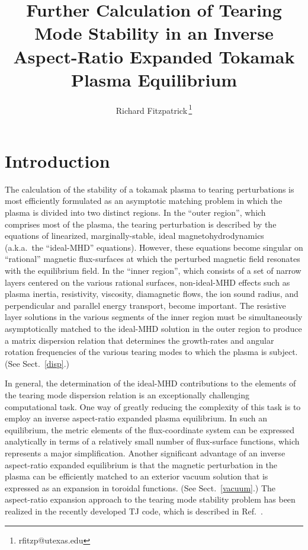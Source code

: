 \documentclass[12pt,prb,aps]{revtex4-1}
\begin{document}
\title{Further Calculation of Tearing Mode Stability in an Inverse Aspect-Ratio Expanded Tokamak Plasma Equilibrium}
\author{Richard Fitzpatrick\,\footnote{rfitzp@utexas.edu}}

\begin{abstract}

\end{abstract}
\maketitle

\section{Introduction} 
The calculation of the stability of a tokamak plasma to tearing perturbations is most efficiently formulated as  an asymptotic
matching problem in which the  plasma is  divided into two distinct regions.\cite{fkr}  In the ``outer region'', which comprises most
of the plasma, the tearing perturbation is described by the equations of linearized, marginally-stable, ideal magnetohydrodynamics (a.k.a.\ the ``ideal-MHD'' equations). 
However, these equations become singular on   ``rational'' magnetic flux-surfaces at which the perturbed magnetic field resonates with the equilibrium field. In the ``inner region'', which
consists of a set of narrow layers centered on the various rational surfaces, non-ideal-MHD effects such as plasma inertia, resistivity, 
viscosity,  diamagnetic flows, the ion sound radius,  and perpendicular and parallel energy transport, become important.\cite{hkm,fw,cole,diff}  The resistive layer
solutions in the various segments of the inner region must be simultaneously asymptotically matched to the ideal-MHD solution in the outer region to produce a matrix 
dispersion relation that determines the growth-rates and angular rotation frequencies of the various tearing modes to which the plasma is subject.\cite{con0,cht} (See Sect.~\ref{disp}.)

In general, the  determination of the ideal-MHD contributions to the elements of the  tearing mode dispersion relation is an exceptionally challenging computational task.\cite{connor,nish,gal,pletz,pletz1,
tokuda,brennan,ham,ham1,ham2,am1,am2,am3,aglas,aglas1,aglas2}
One way of greatly reducing the complexity of this task is to employ an inverse aspect-ratio expanded plasma equilibrium.\cite{greene,gim,inverse} In such an equilibrium,
the metric elements of the flux-coordinate system can be expressed analytically in terms of a relatively small number of  flux-surface functions,
which represents a major simplification.\cite{con0} Another significant advantage of an inverse aspect-ratio expanded equilibrium is that the magnetic perturbation in the plasma can be efficiently 
matched to an exterior vacuum solution  that is expressed as an expansion in toroidal functions.\cite{am1} (See Sect.~\ref{vacuum}.) The aspect-ratio expansion approach to the tearing mode stability problem has been realized in the recently developed TJ code,
which is described in Ref.~.
\end{document}
